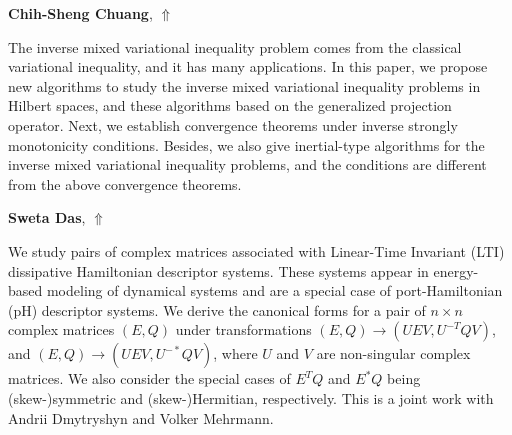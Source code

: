 \documentclass[ILAS2025-program.tex]{subfiles}
\begin{document}
\hypertarget{down0078}{}\begin{ilasabstract}
    
\textbf{Chih-Sheng Chuang},  \hfill \hyperlink{up0078}{$\Uparrow$}
    
    
\mtskip
    The inverse mixed variational inequality problem comes from the classical variational inequality, and it has many
applications. In this paper, we propose new algorithms to study the inverse mixed variational inequality problems in Hilbert spaces, and these algorithms based on the generalized projection operator. Next, we establish convergence theorems under inverse strongly monotonicity conditions. Besides, we also give inertial-type algorithms for the inverse mixed variational inequality problems, and the conditions are different from the above convergence theorems. 

\end{ilasabstract}
    

\hypertarget{down0076}{}\begin{ilasabstract}
    
\textbf{Sweta Das},  \hfill \hyperlink{up0076}{$\Uparrow$}
    
    
\mtskip
    We study pairs of complex matrices associated with Linear-Time Invariant (LTI) dissipative Hamiltonian descriptor systems. These systems appear in energy-based modeling of dynamical systems and are a special case of port-Hamiltonian (pH) descriptor systems. We derive the canonical forms for a pair of $n\times n$ complex matrices $(E,Q)$ under transformations $(E,Q) \rightarrow (UEV,U^{-T}QV)$, and $(E,Q) \rightarrow (UEV,U^{-*}QV)$, where $U$ and $V$ are non-singular complex matrices. We also consider the special cases of $E^TQ$ and $E^*Q$ being (skew-)symmetric and (skew-)Hermitian, respectively. This is a joint work with Andrii Dmytryshyn and Volker Mehrmann. 

\end{ilasabstract}
    
\end{document}

